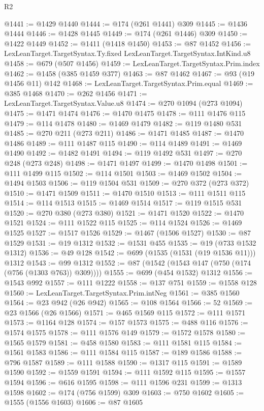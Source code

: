 \begin{lexlean}{R2}
\begin{coremodule}
@1441 := @1429 @1440
@1444 := @174 (@261 @1441) @309
@1445 := @1436 @1444
@1446 := @1428 @1445
@1449 := @174 (@261 @1446) @309
@1450 := @1422 @1449
@1452 := @1411 (@1418 @1450)
@1453 := @87 @1452
@1456 := LexLeanTarget.TargetSyntax.Ty.fixed LexLeanTarget.TargetSyntax.IntKind.u8
@1458 := @679 (@507 @1456)
@1459 := LexLeanTarget.TargetSyntax.Prim.index
@1462 := @1458 (@385 @1459 @377)
@1463 := @87 @1462
@1467 := @93 (@19 @1456 @11) @142
@1468 := LexLeanTarget.TargetSyntax.Prim.equal
@1469 := @385 @1468
@1470 := @262 @1456
@1471 := LexLeanTarget.TargetSyntax.Value.u8
@1474 := @270 @1094 (@273 @1094)
@1475 := @1471 @1474
@1476 := @1470 @1475
@1478 := @111 @1476 @115
@1479 := @114 @1478
@1480 := @1469 @1479
@1482 := @119 @1480 @531
@1485 := @270 @211 (@273 @211)
@1486 := @1471 @1485
@1487 := @1470 @1486
@1489 := @111 @1487 @115
@1490 := @114 @1489
@1491 := @1469 @1490
@1492 := @1482 @1491
@1494 := @119 @1492 @531
@1497 := @270 @248 (@273 @248)
@1498 := @1471 @1497
@1499 := @1470 @1498
@1501 := @111 @1499 @115
@1502 := @114 @1501
@1503 := @1469 @1502
@1504 := @1494 @1503
@1506 := @119 @1504 @531
@1509 := @270 @372 (@273 @372)
@1510 := @1471 @1509
@1511 := @1470 @1510
@1513 := @111 @1511 @115
@1514 := @114 @1513
@1515 := @1469 @1514
@1517 := @119 @1515 @531
@1520 := @270 @380 (@273 @380)
@1521 := @1471 @1520
@1522 := @1470 @1521
@1524 := @111 @1522 @115
@1525 := @114 @1524
@1526 := @1469 @1525
@1527 := @1517 @1526
@1529 := @1467 (@1506 @1527)
@1530 := @87 @1529
@1531 := @19 @1312
@1532 := @1531 @455
@1535 := @19 (@733 @1532 @1312)
@1536 := @49 @128
@1542 := @699 (@1535 (@1531 (@19 @1536 @11))) @1312
@1543 := @99 @1312
@1552 := @87 (@1542 (@1543 @147 (@750 (@174 (@756 (@1303 @763)) @309))))
@1555 := @699 (@454 @1532) @1312
@1556 := @1543 @992
@1557 := @111 @1222
@1558 := @137 @751
@1559 := @1558 @128
@1560 := LexLeanTarget.TargetSyntax.Prim.intNeg
@1561 := @385 @1560
@1564 := @23 @942 (@26 @942)
@1565 := @108 @1564
@1566 := 52
@1569 := @23 @1566 (@26 @1566)
@1571 := @465 @1569 @115
@1572 := @111 @1571
@1573 := @1164 @128
@1574 := @157 @1573
@1575 := @488 @116
@1576 := @1574 @1575
@1578 := @111 @1576 @149
@1579 := @1572 @1578
@1580 := @1565 @1579
@1581 := @458 @1580
@1583 := @111 @1581 @115
@1584 := @1561 @1583
@1586 := @111 @1584 @115
@1587 := @189 @1586
@1588 := @796 @1587
@1589 := @111 @1588
@1590 := @1317 @115
@1591 := @1589 @1590
@1592 := @1559 @1591
@1594 := @111 @1592 @115
@1595 := @1557 @1594
@1596 := @616 @1595
@1598 := @111 @1596 @231
@1599 := @1313 @1598
@1602 := @174 (@756 @1599) @309
@1603 := @750 @1602
@1605 := @1555 (@1556 @1603)
@1606 := @87 @1605

\end{coremodule}
\end{lexlean}
